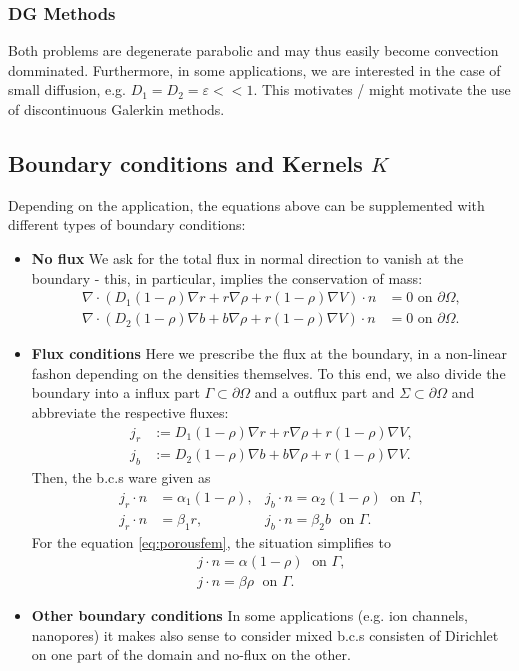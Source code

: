 \documentclass[11pt,a4paper]{article}
\def\eps{\varepsilon}
\theoremstyle{definition}
\numberwithin{equation}{section}
\begin{document}
\subsubsection*{DG Methods}
Both problems are degenerate parabolic and may thus easily become convection domminated. Furthermore, in some applications, we are interested in the case of small diffusion, e.g. $D_1 = D_2 = \eps << 1$. This motivates / might motivate the use of discontinuous Galerkin methods.
\subsection*{Boundary conditions and Kernels $K$}
Depending on the application, the equations above can be supplemented with different types of boundary conditions: 
\begin{itemize}
 \item\textbf{No flux} We ask for the total flux in normal direction to vanish at the boundary - this, in particular, implies the conservation of mass:
 \begin{align*}
  \nabla \cdot (D_1(1-\rho)\nabla r + r \nabla \rho + r(1-\rho)\nabla V)\cdot n &= 0\text{ on } \partial\Omega,\\
  \nabla \cdot (D_2(1-\rho)\nabla b + b \nabla \rho + r(1-\rho)\nabla V)\cdot n &= 0\text{ on } \partial\Omega.
 \end{align*}
 \item\textbf{Flux conditions} Here we prescribe the flux at the boundary, in a non-linear fashon depending on the densities themselves. To this end, we also divide the boundary into a influx part $\Gamma\subset \partial\Omega$ and a outflux part and $\Sigma \subset\partial\Omega$ and abbreviate the respective fluxes:
 \begin{align*}
  j_r &:= D_1(1-\rho)\nabla r + r \nabla \rho + r(1-\rho)\nabla V,\\
  j_b &:= D_2(1-\rho)\nabla b + b \nabla \rho + r(1-\rho)\nabla V.
 \end{align*}
 Then, the b.c.s ware given as 
 \begin{align}
  j_r\cdot n &= \alpha_1 (1-\rho), &j_b\cdot n = \alpha_2 (1-\rho)\;\text{ on }\Gamma,\\
  j_r\cdot n &= \beta_1r, &j_b\cdot n = \beta_2 b\;\text{ on }\Gamma.
 \end{align}
 For the equation \eqref{eq:porousfem}, the situation simplifies to
 \begin{align}
  j\cdot n = \alpha (1-\rho)\;\text{ on }\Gamma,\\
  j\cdot n = \beta \rho\;\text{ on }\Gamma.
 \end{align}
\item\textbf{Other boundary conditions} In some applications (e.g. ion channels, nanopores) it makes also sense to consider mixed b.c.s consisten of Dirichlet on one part of the domain and no-flux on the other.
 \end{itemize}
\end{document}
